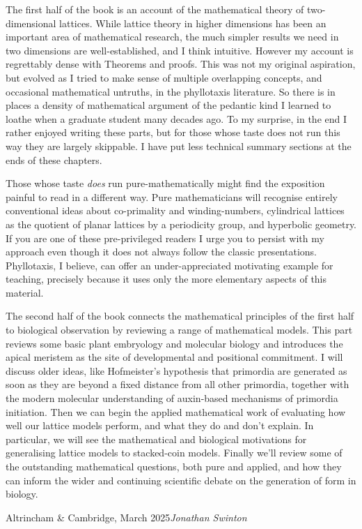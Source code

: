 The first half of the book is an account of the mathematical theory of two-dimensional lattices. While lattice theory in higher dimensions has been an important area of mathematical research, the much simpler results we need in two dimensions are well-established, and I think intuitive. However my account is regrettably dense with Theorems and proofs. This was not my original aspiration, but evolved as I tried to make sense of multiple overlapping concepts, and occasional mathematical untruths, in the phyllotaxis literature.  So there is in places a density of mathematical argument of the pedantic kind I learned to loathe when a graduate student many decades ago. To my surprise, in the end I rather enjoyed writing these parts, but for those whose taste does not run this way they are largely skippable. I have put less technical summary sections at the ends of these chapters.  

Those whose taste \textit{does} run pure-mathematically might find the exposition painful to read in a different way. Pure mathematicians will recognise entirely conventional ideas about co-primality and winding-numbers, cylindrical lattices as the quotient of planar lattices by a periodicity group, and hyperbolic geometry. If you are one of these pre-privileged readers I urge you to persist with my approach even though it does not always follow the classic presentations. Phyllotaxis, I believe, can offer an under-appreciated motivating example for teaching, precisely because it uses only the more elementary aspects of this material. 


The second half of the book connects the mathematical principles of the first half to biological observation by reviewing a range of mathematical models. This part reviews some basic plant embryology and molecular biology and introduces the apical meristem as the site of developmental and positional commitment. I will discuss older ideas, like Hofmeister's hypothesis that primordia are generated as soon as they are beyond a fixed distance from all other primordia, together with the modern molecular understanding of  auxin-based mechanisms of primordia initiation. Then we can begin the applied mathematical work of evaluating how well our lattice models perform, and what they do and don't explain. In particular, we will see the mathematical and biological motivations for generalising lattice models to stacked-coin models. Finally we'll  review some of the outstanding mathematical questions, both pure and applied, and how they can inform the wider and continuing scientific debate on the generation of form in biology.


\vspace{\baselineskip}
\begin{flushright}\noindent
	Altrincham \& Cambridge, March 2025\hfill {\it Jonathan Swinton}\\
\end{flushright}





